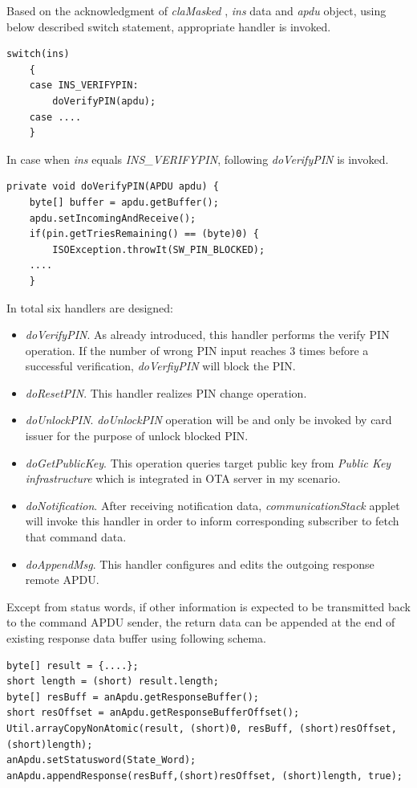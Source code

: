 Based on the acknowledgment of \emph{claMasked} , \emph{ins} data and \emph{apdu} object, using below described switch statement, appropriate handler is invoked.

\begin{Verbatim}[frame=lines,framesep=4mm, label=\fbox{\small\emph{Switch Statement}}]
switch(ins)
	{
	case INS_VERIFYPIN:
		doVerifyPIN(apdu);
	case ....
	}
\end{Verbatim}
In case when \emph{ins} equals \emph{INS\_VERIFYPIN}, following \emph{doVerifyPIN} is invoked.

\begin{Verbatim}[fontsize=\relsize{-1}, frame=lines,framesep=4mm, label=\fbox{\small\emph{doVerifyPIN Handler}}]
private void doVerifyPIN(APDU apdu) {
	byte[] buffer = apdu.getBuffer();
	apdu.setIncomingAndReceive();			
	if(pin.getTriesRemaining() == (byte)0) {
		ISOException.throwIt(SW_PIN_BLOCKED);	
	....
	}
\end{Verbatim}
In total six handlers are designed:
\begin{itemize}
\item \emph{doVerifyPIN}. As already introduced, this handler performs the verify PIN operation. If the number of wrong PIN input reaches 3 times before a successful verification, \emph{doVerfiyPIN} will block the PIN.
\item \emph{doResetPIN}. This handler realizes PIN change operation.
\item \emph{doUnlockPIN}. \emph{doUnlockPIN} operation will be and only be invoked by card issuer for the purpose of unlock blocked PIN.
\item \emph{doGetPublicKey}. This operation queries target public key from \emph{Public Key infrastructure} which is integrated in OTA server in my scenario.
\item \emph{doNotification}. After receiving notification data, \emph{communicationStack} applet will invoke this handler in order to inform corresponding subscriber to fetch that command data. 
\item \emph{doAppendMsg}. This handler configures and edits the outgoing response remote APDU.
\end{itemize}

Except from status words, if other information is expected to be transmitted back to the command APDU sender,  the return data can be appended at the end of existing response data buffer using following schema.

\begin{Verbatim}[fontsize=\relsize{-2.0}, frame=lines,framesep=4mm, label=\fbox{\small\emph{Editing Response Data}}]
byte[] result = {....};
short length = (short) result.length;
byte[] resBuff = anApdu.getResponseBuffer(); 
short resOffset = anApdu.getResponseBufferOffset();
Util.arrayCopyNonAtomic(result, (short)0, resBuff, (short)resOffset, (short)length);	    
anApdu.setStatusword(State_Word);
anApdu.appendResponse(resBuff,(short)resOffset, (short)length, true);
\end{Verbatim}

